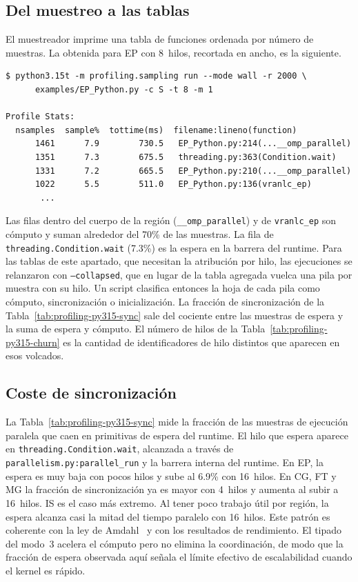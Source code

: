 \subsection{Del muestreo a las tablas}
El muestreador imprime una tabla de funciones ordenada por número de muestras.
La obtenida para EP con 8~hilos, recortada en ancho, es la siguiente.

\begin{verbatim}
$ python3.15t -m profiling.sampling run --mode wall -r 2000 \
      examples/EP_Python.py -c S -t 8 -m 1

Profile Stats:
  nsamples  sample%  tottime(ms)  filename:lineno(function)
      1461      7.9        730.5   EP_Python.py:214(...__omp_parallel)
      1351      7.3        675.5   threading.py:363(Condition.wait)
      1331      7.2        665.5   EP_Python.py:210(...__omp_parallel)
      1022      5.5        511.0   EP_Python.py:136(vranlc_ep)
       ...
\end{verbatim}

Las filas dentro del cuerpo de la región (\texttt{\_\_omp\_parallel}) y de
\texttt{vranlc\_ep} son cómputo y suman alrededor del 70\% de las muestras. La
fila de \texttt{threading.Condition.wait} (7.3\%) es la espera en la barrera del
runtime. Para las tablas de este apartado, que necesitan la atribución por hilo,
las ejecuciones se relanzaron con \texttt{--collapsed}, que en lugar de la tabla
agregada vuelca una pila por muestra con su hilo. Un script clasifica entonces la
hoja de cada pila como cómputo, sincronización o inicialización. La fracción de
sincronización de la Tabla~\ref{tab:profiling-py315-sync} sale del cociente entre
las muestras de espera y la suma de espera y cómputo. El número de hilos de la
Tabla~\ref{tab:profiling-py315-churn} es la cantidad de identificadores de hilo
distintos que aparecen en esos volcados.

\subsection{Coste de sincronización}
La Tabla~\ref{tab:profiling-py315-sync} mide la fracción de las muestras de
ejecución paralela que caen en primitivas de espera del runtime. El hilo que
espera aparece en \texttt{threading.Condition.wait}, alcanzada a través de
\texttt{parallelism.py:parallel\_run} y la barrera interna del runtime. En EP,
la espera es muy baja con pocos hilos y sube al 6.9\% con 16~hilos. En CG, FT y
MG la fracción de sincronización ya es mayor con 4~hilos y aumenta al subir a
16~hilos. IS es el caso más extremo. Al tener poco trabajo útil por región, la
espera alcanza casi la mitad del tiempo paralelo con 16~hilos. Este patrón es
coherente con la ley de Amdahl~\cite{Amdahl1967} y con los resultados de
rendimiento. El tipado del modo~3 acelera el cómputo pero no elimina la
coordinación, de modo que la fracción de espera observada aquí señala el límite
efectivo de escalabilidad cuando el kernel es rápido.

